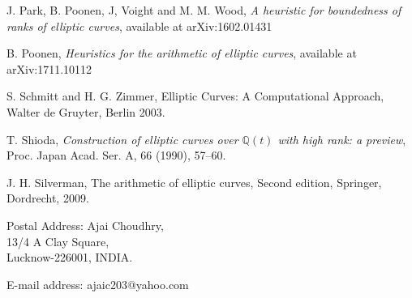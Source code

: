 \documentclass[11pt, leqno]{article}
\begin{document}
\begin{thebibliography}{99}
 J. Park, B. Poonen, J, Voight and M. M. Wood, {\it A heuristic for boundedness of ranks of
elliptic curves}, available at arXiv:1602.01431 

 B. Poonen, {\it Heuristics for the arithmetic of elliptic curves}, available at  	arXiv:1711.10112 

 S. Schmitt and H. G. Zimmer,  Elliptic Curves: A Computational Approach, Walter de Gruyter, Berlin 2003.

 T. Shioda, {\it Construction of elliptic curves over $\mathbb{Q}(t)$ with high rank: a preview}, 
Proc. Japan Acad. Ser. A, 66 (1990), 57--60.

 J. H. Silverman, The arithmetic of elliptic curves, Second edition, Springer, Dordrecht, 2009.


\end{thebibliography}
\noindent Postal Address: Ajai Choudhry, \\
\noindent \hspace{1.05 in} 13/4 A Clay Square, \\
\noindent \hspace{1.05 in} Lucknow-226001, INDIA.

\noindent E-mail address: ajaic203@yahoo.com

	
\end{document}
